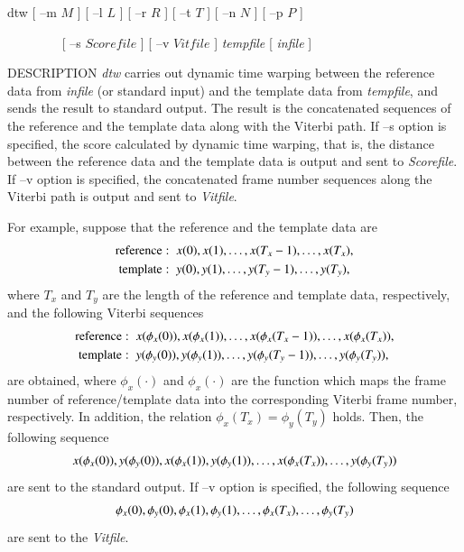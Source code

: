 \hypertarget{dtw}{}
\begin{synopsis}
\item[dtw] [ --m $M$ ]  [ --l $L$ ]  [ --r $R$ ]  [ --t $T$ ]
           [ --n $N$ ]  [ --p $P$ ]
 \item [\ ~~~~~~~] [ --s $Scorefile$ ]  [ --v $Vitfile$ ]
 {\em tempfile} [ {\em infile} ]
\end{synopsis}

\begin{qsection}{DESCRIPTION}
 {\em dtw} carries out dynamic time warping between
 the reference data from {\em infile} (or standard input)
 and the template data from {\em tempfile},
 and sends the result to standard output.
 The result is the concatenated sequences
 of the reference and the template data
 along with the Viterbi path.
 If --s option is specified,
 the score calculated by dynamic time warping,
 that is, the distance between the reference data and the template data
 is output and sent to {\em Scorefile}.
 If --v option is specified,
 the concatenated frame number sequences
 along the Viterbi path
 is output and sent to {\em Vitfile}.

 For example, suppose that the reference and the template data are
 \begin{align}
  \mathrm{reference} :\;\; & x(0), x(1), \dots, x(T_x - 1), \dots, x(T_x), \notag \\
  \mathrm{template}  :\;\; & y(0), y(1), \dots, y(T_y - 1), \dots, y(T_y), \notag
 \end{align}
 where $T_x$ and $T_y$ are the length of the reference and template data,
 respectively,
 and the following Viterbi sequences
 \begin{align}
  \mathrm{reference} :\;\; & x(\phi_x(0)), x(\phi_x(1)), \dots, x(\phi_x(T_x - 1)),
  \dots, x(\phi_{x}(T_x)), \notag \\
  \mathrm{template}  :\;\; & y(\phi_y(0)), y(\phi_y(1)), \dots,
  y(\phi_y(T_y - 1)), \dots, y(\phi_y(T_y)), \notag
 \end{align}
 are obtained, where $\phi_x(\cdot)$ and $\phi_x(\cdot)$ are the function which
 maps the frame number of reference/template data
 into the corresponding Viterbi frame number, respectively.
 In addition, the relation $\phi_x(T_x)=\phi_y(T_y)$ holds.
 Then, the following sequence
 \begin{align}
  x(\phi_x(0)), y(\phi_y(0)),
  x(\phi_x(1)), y(\phi_y(1)),
  \dots, x(\phi_{x}(T_x)), \dots, y(\phi_y(T_y)) \notag
 \end{align}
 are sent to the standard output.
 If --v option is specified, the following sequence
 \begin{align}
  \phi_x(0), \phi_y(0),
  \phi_x(1), \phi_y(1),
  \dots, \phi_{x}(T_x), \dots, \phi_y(T_y) \notag
 \end{align}
 are sent to the {\em Vitfile}.


\end{qsection}
